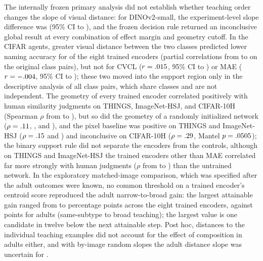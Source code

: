 \documentclass[11pt]{article}
\begin{document}
The internally frozen primary analysis did not establish whether teaching order changes the slope of visual distance: for DINOv2-small, the experiment-level slope difference was \VtOrdDelta{} (95\% CI \VtOrdLo{} to \VtOrdHi), and the frozen decision rule returned an inconclusive global result at every combination of effect margin and geometry cutoff. In the CIFAR agents, greater visual distance between the two classes predicted lower naming accuracy for \VtDSupportWord{} of the eight trained encoders (partial correlations from \VtDrMin{} to \VtDrMax{} on the \VtDN{} original class pairs), but not for CVCL ($r = .015$, 95\% CI \VtDCvclLo{} to \VtDCvclHi) or MAE ($r = -.004$, 95\% CI \VtDMaeLo{} to \VtDMaeHi); these two moved into the support region only in the descriptive analysis of all \VtDallN{} class pairs, which share classes and are not independent. The geometry of every trained encoder correlated positively with human similarity judgments on THINGS, ImageNet-HSJ, and CIFAR-10H (Spearman $\rho$ from \VtHoneMin{} to \VtHoneMax), but so did the geometry of a randomly initialized network ($\rho = .11$, \VtHoneRandHsj, and \VtHoneRandCten), and the pixel baseline was positive on THINGS and ImageNet-HSJ ($\rho = .15$ and \VtHonePixHsj) and inconclusive on CIFAR-10H ($\rho = .29$, Mantel $p = .0505$); the binary support rule did not separate the encoders from the controls, although on THINGS and ImageNet-HSJ the trained encoders other than MAE correlated far more strongly with human judgments ($\rho$ from \VcHoneTrMin{} to \VcHoneTrMax) than the untrained network. In the exploratory matched-image comparison, which was specified after the adult outcomes were known, no common threshold on a trained encoder's centroid score reproduced the adult narrow-to-broad gain: the largest attainable gain ranged from \VtXJumpMin{} to \VtXJumpMax{} percentage points across the eight trained encoders, against \VtXJumpAdult{} points for adults (same-subtype to broad teaching); the largest value is one candidate in twelve below the next attainable step. Post hoc, distances to the individual teaching examples did not account for the effect of composition in adults either, and with by-image random slopes the adult distance slope was uncertain for \VcImgTrInclList.
\end{document}
